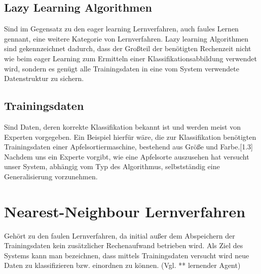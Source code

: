 \documentclass[fontsize=11pt]{scrartcl}
\begin{document}
            \subsection{Lazy Learning Algorithmen}  
                Sind im Gegensatz zu den eager learning Lernverfahren, auch faules Lernen gennant, eine weitere Kategorie von Lernverfahren. Lazy learning Algorithmen sind gekennzeichnet dadurch, dass der Großteil der benötigten Rechenzeit nicht wie beim eager Learning zum Ermitteln einer Klassifikationsabbildung verwendet wird, sondern es genügt alle Trainingsdaten in eine vom System verwendete Datenstruktur zu sichern. 
                            
            \subsection{Trainingsdaten}
                Sind Daten, deren    korrekte Klassifikation   bekannt ist und werden meist von Experten vorgegeben.
                Ein Beispiel hierfür wäre, die zur Klassifikation benötigten Trainingsdaten einer Apfelsortiermaschine, bestehend aus Größe und Farbe.[1.3]
                Nachdem uns ein Experte vorgibt, wie eine Apfelsorte auszusehen hat versucht unser System, abhängig vom Typ des Algorithmus, selbstständig eine Generalisierung vorzunehmen. 
                        
        \section{Nearest-Neighbour Lernverfahren}
            Gehört zu den faulen Lernverfahren, da initial außer dem Abspeichern der Trainingsdaten kein zusätzlicher Rechenaufwand betrieben wird. Als Ziel des Systems kann man bezeichnen, dass mittels Trainingsdaten versucht wird neue Daten zu klassifizieren bzw. einordnen zu können. (Vgl. ** lernender Agent)
                        
\end{document}
